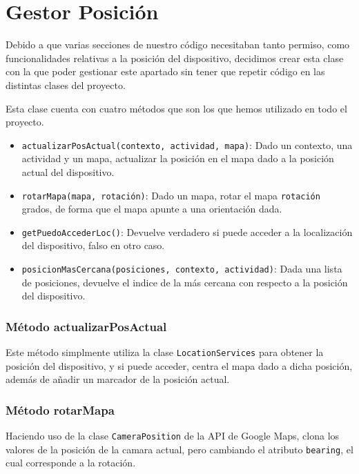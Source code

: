 \section{Gestor Posición}

Debido a que varias secciones de nuestro código necesitaban tanto permiso, como funcionalidades relativas a la posición del dispositivo, decidimos crear esta clase con la que poder gestionar este apartado sin tener que repetir código en las distintas clases del proyecto.


Esta clase cuenta con cuatro métodos que son los que hemos utilizado en todo el proyecto.

\begin{itemize}
	\item \texttt{actualizarPosActual(contexto, actividad, mapa)}: Dado un contexto, una actividad y un mapa, actualizar la posición en el mapa dado a la posición actual del dispositivo.
	\item \texttt{rotarMapa(mapa, rotación)}: Dado un mapa, rotar el mapa \texttt{rotación} grados, de forma que el mapa apunte a una orientación dada.
	\item \texttt{getPuedoAccederLoc()}: Devuelve verdadero si puede acceder a la localización del dispositivo, falso en otro caso.
	\item \texttt{posicionMasCercana(posiciones, contexto, actividad)}: Dada una lista de posiciones, devuelve el indice de la más cercana con respecto a la posición del dispositivo.
\end{itemize}


\subsubsection{Método actualizarPosActual}

Este método simplmente utiliza la clase \texttt{LocationServices}\cite{locationServices} para obtener la posición del dispositivo, y si puede acceder, centra el mapa dado a dicha posición, además de añadir un marcador de la posición actual.


\subsubsection{Método rotarMapa}

Haciendo uso de la clase \texttt{CameraPosition}\cite{cameraPosition} de la API de Google Maps, clona los valores de la posición de la camara actual, pero cambiando el atributo \texttt{bearing}, el cual corresponde a la rotación.

